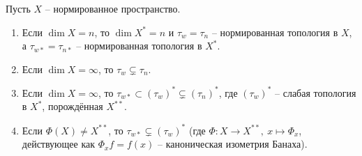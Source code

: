 \begin{corollary}\label{cor:weak-weak-star-comparison}
    Пусть $X$ -- нормированное пространство.
    \begin{enumerate}
        \item Если $\dim X = n$, то $\dim X^* = n$ и $\tau_w = \tau_n$ -- нормированная топология в $X$, а $\tau_{w*} = \tau_{n*}$ -- нормированная топология в $X^*$.
        \item Если $\dim X = \infty$, то $\tau_w \subsetneq \tau_n$.
        \item Если $\dim X = \infty$, то $\tau_{w*} \subset (\tau_w)^* \subsetneq (\tau_{n})^*$, где $(\tau_w)^*$ -- слабая топология в $X^*$, порождённая $X^{**}$.
        \item Если $\Phi(X) \neq X^{**}$, то $\tau_{w*} \subsetneq (\tau_w)^*$ (где $\Phi\colon X \to X^{**}, \ x \mapsto \Phi_x$, действующее как $\Phi_x f = f(x)$ -- каноническая изометрия Банаха).
    \end{enumerate}
\end{corollary}

